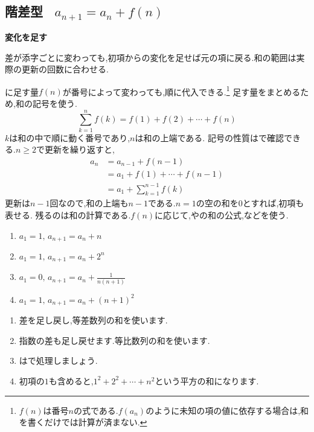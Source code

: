
  \subsection{\texorpdfstring{階差型 \, $a_{n+1}=a_n+f(n)$}{階差型}}\label{節：階差型}
  \begin{bookpoint}
    \textbf{変化を足す}\par
    差が添字ごとに変わっても,初項からの変化を足せば元の項に戻る.和の範囲は実際の更新の回数に合わせる.
  \end{bookpoint}
    に足す量$f(n)$が番号によって変わっても,順に代入できる.\footnote{$f(n)$は番号$n$の式である.$f(a_n)$のように未知の項の値に依存する場合は,和を書くだけでは計算が済まない.}
    足す量をまとめるため,和の記号を使う.
    \[
      \sum_{k=1}^{n}f(k)=f(1)+f(2)+\cdots+f(n)
    \]
    $k$は和の中で順に動く番号であり,$n$は和の上端である.
    記号の性質はで確認できる.$n\ge2$で更新を繰り返すと,
    \begin{align*}
      a_n&=a_{n-1}+f(n-1)\\
         &=a_1+f(1)+\cdots+f(n-1)\\
         &=a_1+\sum_{k=1}^{n-1}f(k)
    \end{align*}
    更新は$n-1$回なので,和の上端も$n-1$である.$n=1$の空の和を$0$とすれば,初項も表せる.
    残るのは和の計算である.$f(n)$に応じて,やの和の公式,などを使う.

    \noindent {}\par\nobreak
    \begin{enumerate}[label=(\arabic*),parsep=3pt,format=\bookitemlink{example-difference-1}{problem}{answer}]
      \item $\displaystyle a_1=1,\, a_{n+1}=a_n+n$
      \item $\displaystyle a_1=1,\, a_{n+1}=a_n+2^n$
      \item $\displaystyle a_1=0,\, a_{n+1}=a_n+\frac{1}{n(n+1)}$
      \item $\displaystyle a_1=1,\, a_{n+1}=a_n+(n+1)^2$
    \end{enumerate}

    \noindent{}\par\nobreak
    \begin{enumerate}[label=(\arabic*),parsep=3pt,format=\bookitemlink{example-difference-1}{hint}{problem}]
      \item 差を足し戻し,等差数列の和を使います.
      \item 指数の差も足し戻せます.等比数列の和を使います.
      \item {}はで処理しましょう.
      \item 初項の$1$も含めると,$1^2+2^2+\cdots+n^2$という平方の和になります.
    \end{enumerate}

